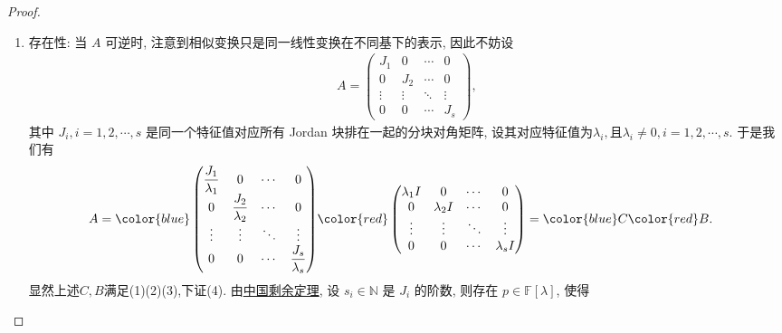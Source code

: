 \documentclass[../../main.tex]{subfiles}
\begin{document}
\begin{proof}
\begin{enumerate}
{\heiti 唯一性:} 若还有 \( A = C_1 + B_1 \) 且满足条件 (1)(2)(3), 则 \( C_1 - C = B - B_1 \). 又 \( C_1 \) 和 \( C_1 \), \( B_1 \) 可交换, 所以 \( C_1 \) 和 \( A \) 可交换,又$C=q(A)$, 所以 \( C_1 \) 和 \( C \) 可交换. 类似的 \( B\)和\( B_1 \) 可交换. 因此对充分大的 \( n \), 利用$C,C_1$为幂零矩阵,我们有
\[
0 = \sum_{k=0}^{n} C_n^k (C_1)^k C^{n - k} = (C_1 - C)^n = (B - B_1)^n .
\]
由\hyperref[proposition:一族两两可交换的可对角化矩阵可同时相似对角化]{可交换的矩阵同时对角化}知,存在可逆阵 $Q$，使 $Q^{-1}BQ$ 和 $Q^{-1}B_1Q$ 都是对角阵。于是由上式可得
\[
(Q^{-1}BQ - Q^{-1}B_1Q)^{n} = \left(Q^{-1}(B - B_1)Q\right)^{n} = Q^{-1}(Q - B_1)^{n}Q = O,
\]
两个对角阵之差仍是一个对角阵，这个差的幂要等于零矩阵，则这两个矩阵必相等，由此即得 $B = B_1$，从而 $C = C_1$。
这就证明了唯一性.

\item {\heiti 存在性:} 当 \( A \) 可逆时, 注意到相似变换只是同一线性变换在不同基下的表示, 因此不妨设
\begin{align*}
A = \begin{pmatrix}
J_1 & 0 & \cdots & 0 \\
0 & J_2 & \cdots & 0 \\
\vdots & \vdots & \ddots & \vdots \\
0 & 0 & \cdots & J_s
\end{pmatrix},
\end{align*}
其中 \( J_i, i = 1, 2, \cdots, s \) 是同一个特征值对应所有 Jordan 块排在一起的分块对角矩阵, 设其对应特征值为$ \lambda_i,$且$\lambda_i\ne 0, i = 1, 2, \cdots, s.$
于是我们有
\begin{align*}
A &= {\color{blue} \begin{pmatrix}
\dfrac{J_1}{\lambda_1} & 0 & \cdots & 0 \\
0 & \dfrac{J_2}{\lambda_2} & \cdots & 0 \\
\vdots & \vdots & \ddots & \vdots \\
0 & 0 & \cdots & \dfrac{J_s}{\lambda_s}
\end{pmatrix}}
{\color{red} \begin{pmatrix}
\lambda_1 I & 0 & \cdots & 0 \\
0 & \lambda_2 I & \cdots & 0 \\
\vdots & \vdots & \ddots & \vdots \\
0 & 0 & \cdots & \lambda_s I
\end{pmatrix}} = {\color{blue} C}{\color{red} B}.
\end{align*}
显然上述$C,B$满足(1)(2)(3),下证(4).
由\hyperref[theorem:中国剩余定理(多项式版)]{中国剩余定理}, 设 \( s_i \in \mathbb{N} \) 是 \( J_i \) 的阶数, 则存在 \( p \in \mathbb{F}[\lambda] \), 使得

\end{enumerate}
\end{proof}
\end{document}
